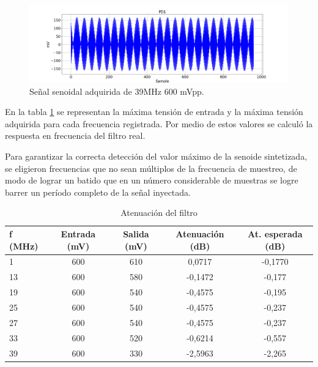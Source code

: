\begin{figure}[htpb]
	\hspace{-1.2cm}
	\includegraphics[width=165mm]{./Figures/sin39.png}
	\caption{Señal senoidal adquirida de 39MHz 600 mVpp.}
	\label{fig:sin39}
\end{figure}

\vspace{5mm}

En la tabla \ref{tab:tensiones} se representan la máxima tensión de entrada y la máxima tensión adquirida para cada frecuencia registrada. Por medio de estos valores se calculó la respuesta en frecuencia del filtro real.
 
Para garantizar la correcta detección del valor máximo de la senoide sintetizada, se eligieron frecuencias que no sean múltiplos de la frecuencia de muestreo, de modo de lograr un batido que en un número considerable de muestras se logre barrer un período completo de la señal inyectada.
 
\vspace{5mm}

\begin{table}[h]
\centering
\caption[Antenuación del filtro]{Atenuación del filtro}
\begin{tabular*}{\textwidth}{l c c c c}
\toprule
\textbf{f (MHz)} & \textbf{Entrada (mV)} & \textbf{Salida (mV)} & \textbf{Atenuación (dB)} & \textbf{At. esperada (dB)}\\
\midrule
1 & 600 & 610 & 0,0717 & -0,1770 \\
13 & 600 & 580 & -0,1472 & -0,177 \\
19 & 600 & 540 & -0,4575 & -0,195 \\
25 & 600 & 540 & -0,4575 & -0,237 \\
27 & 600 & 540 & -0,4575 & -0,237 \\
33 & 600 & 520 & -0,6214 & -0,557 \\
39 & 600 & 330 & -2,5963 & -2,265 \\
\bottomrule
\hline
\end{tabular*}
\label{tab:tensiones}
\end{table}

